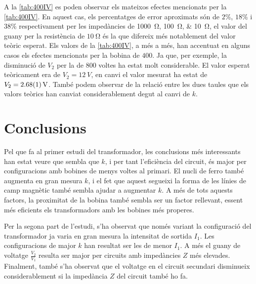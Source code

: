 A la \cref{tab:400IV} es poden observar els mateixos efectes mencionats per la \cref{tab:400IV}. En aquest cas, els percentatges de error aproximats són de $2\%$, $18\%$ i $38\%$ respectivament per les impedàncies de \SIlist{1000;100;10}{\ohm}, el valor del guany per la resistència de $ \SI{10}{\ohm}$ és la que difereix més notablement del valor teòric esperat. Els valors de la \cref{tab:400IV}, a més a més, han accentuat en alguns casos els efectes mencionats per la bobina de $400$. Ja que, per exemple, la disminució de $V_2$  per la de $800$ voltes ha estat molt considerable. El valor esperat teòricament era de $V_2=\SI{12}{V}$, en canvi el valor mesurat ha estat de $V_2 = \data{2.68}{0.01}{V}$. També podem observar de la relació entre les dues taules que els valors teòrics han canviat considerablement degut al canvi de $k$. 

\section{Conclusions}
Pel que fa al primer estudi del transformador, les conclusions més interessants han estat veure que sembla que $k$, i per tant l'eficiència del circuit, és major per configuracions amb bobines de menys voltes al primari. El nucli de ferro també augmenta en gran mesura $k$, i el fet que aquest segueixi la forma de les línies de camp magnètic també sembla ajudar a augmentar $k$. A més de tots aquests factors, la proximitat de la bobina també sembla ser un factor rellevant, essent més eficients els transformadors amb les bobines més properes.

Per la segona part de l'estudi, s'ha observat que només variant la configuració del transformador ja varia en gran mesura la intensitat de sortida $I_1$. Les configuracions de major $k$ han resultat ser les de menor $I_1$. A més el guany de voltatge $\frac{V_2}{V_1}$ resulta ser major per circuits amb impedàncies $Z$ més elevades. Finalment, també s'ha observat que el voltatge en el circuit secundari disminueix considerablement si la impedància $Z$ del circuit també ho fa.
